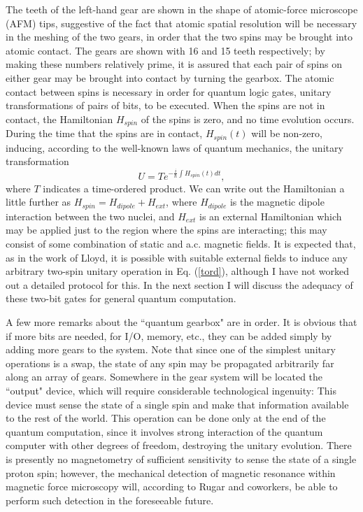 The teeth of the left-hand gear are shown in the
shape of atomic-force microscope (AFM) tips, suggestive of the fact that
atomic spatial resolution will be necessary in the meshing of the two
gears, in order that the two spins may be brought into atomic contact.
The gears are shown with 16 and 15 teeth respectively; by making these
numbers relatively prime, it is assured that each pair of spins on
either gear may be brought into contact by turning the gearbox.
The atomic contact between spins is necessary in order for quantum
logic gates, unitary transformations of pairs of bits, to be executed.
When the spins are not in contact, the Hamiltonian
$H_{spin}$ of the spins is
zero, and no time evolution occurs.  During the time that the spins
are in contact, $H_{spin}(t)$ will be non-zero, inducing, according
to the well-known laws of quantum mechanics\cite{Neg},
the unitary transformation
\begin{equation}
U=Te^{-\frac{i}{\hbar}\int H_{spin}(t)dt},\label{tord}
\end{equation}
where $T$ indicates a time-ordered product.  We can write out the
Hamiltonian a little further as $H_{spin}=H_{dipole}+H_{ext}$, where
$H_{dipole}$ is the magnetic dipole interaction between the two
nuclei, and $H_{ext}$ is an external Hamiltonian which may be
applied just to the region where the spins are interacting; this
may consist of some combination of static and a.c. magnetic fields.
It is expected that, as in the work of Lloyd\cite{Lloyd},
it is possible with suitable external fields to induce any arbitrary
two-spin unitary operation in Eq. (\ref{tord}), although I have not
worked out a detailed protocol for this.  In the next section
I will discuss the adequacy of these two-bit gates for general
quantum computation.

A few more remarks about the ``quantum gearbox" are in order.
It is obvious that if more bits are needed, for I/O, memory, etc.,
they can be added simply by adding more gears to the system.
Note that since one of the
simplest unitary operations is a swap, the state of any spin may
be propagated arbitrarily far along an array of gears.  Somewhere in
the gear system will be located the ``output" device, which will require
considerable technological ingenuity:  This device must sense the
state of a single spin and make that information available to the
rest of the world.  This operation can be done only at the end of
the quantum computation, since it involves strong interaction of
the quantum computer with other degrees of freedom, destroying
the unitary evolution.  There is presently no magnetometry of
sufficient sensitivity to sense the state of a single proton spin;
however, the mechanical detection of magnetic resonance within
magnetic force microscopy will, according to Rugar and coworkers\cite{Rugar},
be able to perform such detection in the foreseeable future.

